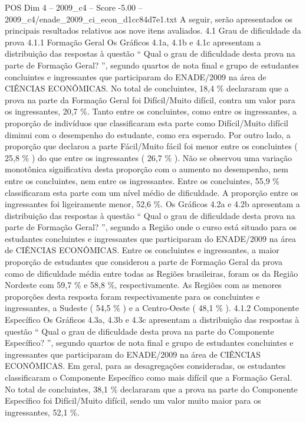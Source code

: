 \begin{textsample}{POS Dim 4 – 2009\_c4 – Score -5.00 – 2009\_c4/enade\_2009\_ci\_econ\_d1cc84d7e1.txt}
A seguir, serão apresentados os principais resultados relativos aos nove itens avaliados. 4.1 Grau de dificuldade da prova 4.1.1 Formação Geral Os Gráficos 4.1a, 4.1b e 4.1c apresentam a distribuição das respostas à questão “ Qual o grau de dificuldade desta prova na parte de Formação Geral? ”, segundo quartos de nota final e grupo de estudantes concluintes e ingressantes que participaram do ENADE/2009 na área de CIÊNCIAS ECONÔMICAS.
No total de concluintes, 18,4 \% declararam que a prova na parte da Formação Geral foi Difícil/Muito difícil, contra um valor para os ingressantes, 20,7 \%.
Tanto entre os concluintes, como entre os ingressantes, a proporção de indivíduos que classificaram esta parte como Difícil/Muito difícil diminui com o desempenho do estudante, como era esperado.
Por outro lado, a proporção que declarou a parte Fácil/Muito fácil foi menor entre os concluintes ( 25,8 \% ) do que entre os ingressantes ( 26,7 \% ).
Não se observou uma variação monotônica significativa desta proporção com o aumento no desempenho, nem entre os concluintes, nem entre os ingressantes.
Entre os concluintes, 55,9 \% classificaram esta parte com um nível médio de dificuldade.
A proporção entre os ingressantes foi ligeiramente menor, 52,6 \%.
Os Gráficos 4.2a e 4.2b apresentam a distribuição das respostas à questão “ Qual o grau de dificuldade desta prova na parte de Formação Geral? ”, segundo a Região onde o curso está situado para os estudantes concluintes e ingressantes que participaram do ENADE/2009 na área de CIÊNCIAS ECONÔMICAS.
Entre os concluintes e ingressantes, a maior proporção de estudantes que considerou a parte de Formação Geral da prova como de dificuldade média entre todas as Regiões brasileiras, foram os da Região Nordeste com 59,7 \% e 58,8 \%, respectivamente.
As Regiões com as menores proporções desta resposta foram respectivamente para os concluintes e ingressantes, a Sudeste ( 54,5 \% ) e a Centro-Oeste ( 48,1 \% ). 4.1.2 Componente Específico Os Gráficos 4.3a, 4.3b e 4.3c apresentam a distribuição das respostas à questão “ Qual o grau de dificuldade desta prova na parte do Componente Específico? ”, segundo quartos de nota final e grupo de estudantes concluintes e ingressantes que participaram do ENADE/2009 na área de CIÊNCIAS ECONÔMICAS.
Em geral, para as desagregações consideradas, os estudantes classificaram o Componente Específico como mais difícil que a Formação Geral.
No total de concluintes, 38,1 \% declararam que a prova na parte do Componente Específico foi Difícil/Muito difícil, sendo um valor muito maior para os ingressantes, 52,1 \%.

\end{textsample}
